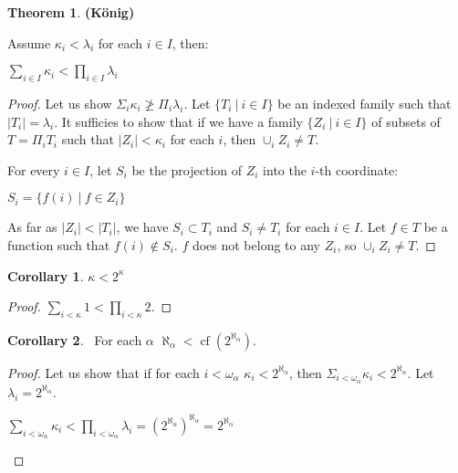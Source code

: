 \documentclass[8pt]{article}
\theoremstyle{definition}
\theoremstyle{definition}
\newtheorem{theorem}{Theorem}[section]
\theoremstyle{definition}
\theoremstyle{definition}
\theoremstyle{definition}
\theoremstyle{definition}
\theoremstyle{definition}
\theoremstyle{definition}
\theoremstyle{definition}
\theoremstyle{definition}
\theoremstyle{definition}
\theoremstyle{definition}
\theoremstyle{definition}
\theoremstyle{definition}
\newtheorem{col}{Corollary}[section]
\theoremstyle{question}
\begin{document}
\begin{theorem} {\bf (K\"{o}nig)}

  Assume $\kappa_i < \lambda_i$ for each $i \in I$, then:
  \begin{center}
    $\sum \limits_{i \in I} \kappa_i < \prod \limits_{i \in I} \lambda_i$
  \end{center}
\end{theorem}

\begin{proof}
  Let us show $\Sigma_i \kappa_i \ngeq \Pi_i \lambda_i$. 
  Let $\{ T_i \: | \: i \in I\}$ be an indexed family such that $|T_i| = \lambda_i$.
  It sufficies to show that if we have a family $\{ Z_i \: | \: i \in I\}$ of subsets of $T = \Pi_i T_i$
  such that $|Z_i| < \kappa_i$ for each $i$, then $\cup_i Z_i \neq T$.

  For every $i \in I$, let $S_i$ be the projection of $Z_i$ into the $i$-th coordinate:
  \begin{center}
    $S_i = \{ f(i) \: | \: f \in Z_i \}$
  \end{center}

  As far as $|Z_i| < |T_i|$, we have $S_i \subset T_i$ and $S_i \neq T_i$ for each $i \in I$.
  Let $f \in T$ be a function such that $f(i) \notin S_i$. $f$ does not belong to any $Z_i$, so $\cup_i Z_i \neq T$.
\end{proof}

\begin{col}
  $\kappa < 2^{\kappa}$
\end{col}

\begin{proof}
  $\sum \limits_{i < \kappa} 1 < \prod \limits_{i < \kappa} 2$.
\end{proof}

\begin{col}~\label{cofinality:aleph}
  For each $\alpha$ $\aleph_{\alpha} < \operatorname{cf}(2^{\aleph_{\alpha}})$.
\end{col}

\begin{proof}
  Let us show that if for each $i < \omega_{\alpha}$ $\kappa_i < 2^{\aleph_{\alpha}}$,
  then $\Sigma_{i < \omega_{\alpha}} \kappa_i < 2^{\aleph_{\alpha}}$.
  Let $\lambda_i = 2^{\aleph_{\alpha}}$.
  \begin{center}
    $\sum \limits_{i < \omega_{\alpha}} \kappa_i < \prod \limits_{i < \omega_{\alpha}} \lambda_i = (2^{\aleph_{\alpha}})^{\aleph_{\alpha}} = 2^{\aleph_{\alpha}}$
  \end{center}
\end{proof}
\end{document}
